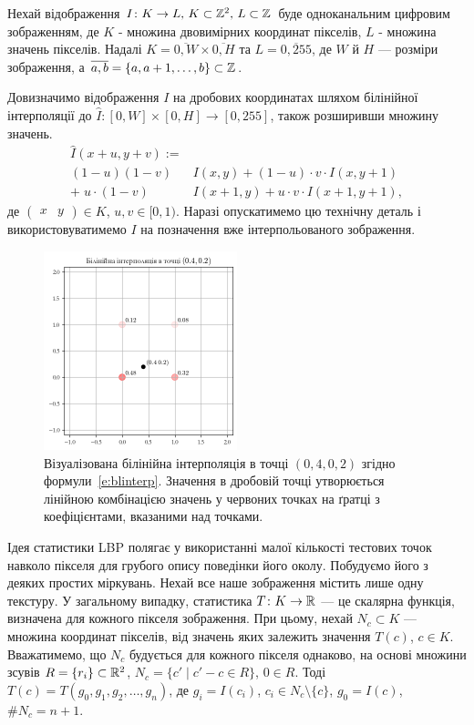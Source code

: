 Нехай відображення \(I \colon K \to L$, $K \subset \Z^2$, $L \subset \Z\) 
буде одноканальним цифровим зображенням, 
де $K$ - множина двовимірних координат пікселів, $L$ - множина значень пікселів.
Надалі $K = \overline{0,W} \times \overline{0,H}$ та $L = \overline{0,255}$, 
де $W$ й $H$ --- розміри зображення, а $\overline{a,b} = \{a, a+1, \dots , b\} \subset \mathbb Z$.

Довизначимо відображення $I$ на дробових координатах шляхом білінійної інтерполяції до $\hat I \colon [0,W] \times [0,H] \to [0,255]$, також розширивши множину значень.
\begin{equation}\label{e:blinterp}
\begin{split}
    \hat I(x+u,y+v) := \\
    (1 - u)(1 - v) & I(x,y) + (1-u) \cdot v \cdot I(x,y+1)\\ 
    + \; u \cdot (1-v) & I(x+1,y) + u \cdot v \cdot  I(x+1,y+1),
\end{split}
\end{equation}
де $\begin{pmatrix} x & y \end{pmatrix} \in K$, $u,v \in [0,1)$. 
Наразі опускатимемо цю технічну деталь і використовуватимемо $I$ на позначення вже інтерпольованого зображення.

\begin{figure}[h]
    \centering
    \includegraphics[width=0.5\textwidth]{img/bilinear-interpolation-1.png}
    \caption{
        Візуалізована білінійна інтерполяція в точці $(0{,}4,0{,}2)$ згідно формули~\eqref{e:blinterp}. 
        Значення в дробовій точці утворюється лінійною комбінацією значень у червоних точках на ґратці
        з коефіцієнтами, вказаними над точками.
    }
    \label{fig:bilinear-interp}
\end{figure}

Ідея статистики LBP \cite{ojala2002} полягає у використанні малої кількості тестових точок навколо пікселя для грубого опису поведінки його околу.
Побудуємо його з деяких простих міркувань.
Нехай все наше зображення містить лише одну текстуру.
У загальному випадку, статистика $T \colon K \to \mathbb R$ --- це скалярна функція, визначена для кожного пікселя зображення. 
При цьому, нехай $N_c \subset K$ --- множина координат пікселів, від значень яких залежить значення $T(c)$, $c \in K$. 
Вважатимемо, що $N_c$ будується для кожного пікселя однаково, на основі множини зсувів $R = \{r_i\} \subset \mathbb R^2$, $N_c = \{c' \mid c' - c \in R\}$, $0 \in R$.
Тоді $T(c) = T(g_0, g_1, g_2, \dots, g_n)$, де $g_i = I(c_i)$, $c_i \in N_c \setminus \{c\}$, $g_0 = I(c)$, $\# N_c = n+1$.

